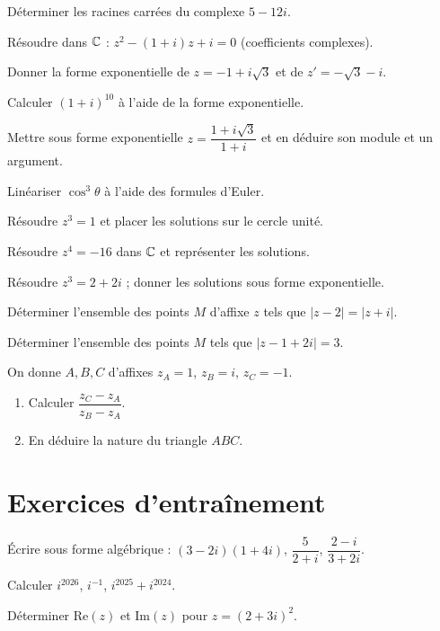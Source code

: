 \exo{} Déterminer les racines carrées du complexe $5-12i$.

\exo{} Résoudre dans $\mathbb{C}$ : $z^{2}-(1+i)z+i=0$ (coefficients complexes).

\exo{} Donner la forme exponentielle de $z=-1+i\sqrt3$ et de $z'=-\sqrt3-i$.

\exo{} Calculer $(1+i)^{10}$ à l'aide de la forme exponentielle.

\exo{} Mettre sous forme exponentielle $z=\dfrac{1+i\sqrt3}{1+i}$ et en déduire son module
et un argument.

\exo{} Linéariser $\cos^{3}\theta$ à l'aide des formules d'Euler.

\exo{} Résoudre $z^{3}=1$ et placer les solutions sur le cercle unité.

\exo{} Résoudre $z^{4}=-16$ dans $\mathbb{C}$ et représenter les solutions.

\exo{} Résoudre $z^{3}=2+2i$ ; donner les solutions sous forme exponentielle.

\exo{} Déterminer l'ensemble des points $M$ d'affixe $z$ tels que $|z-2|=|z+i|$.

\exo{} Déterminer l'ensemble des points $M$ tels que $|z-1+2i|=3$.

\exo{} On donne $A,B,C$ d'affixes $z_A=1$, $z_B=i$, $z_C=-1$.
\begin{enumerate}[label=\arabic*)]
\item Calculer $\dfrac{z_C-z_A}{z_B-z_A}$.
\item En déduire la nature du triangle $ABC$.
\end{enumerate}

\section{Exercices d'entraînement}

\exo{} Écrire sous forme algébrique : $(3-2i)(1+4i)$, $\dfrac{5}{2+i}$, $\dfrac{2-i}{3+2i}$.

\exo{} Calculer $i^{2026}$, $i^{-1}$, $i^{2025}+i^{2024}$.

\exo{} Déterminer $\mathrm{Re}(z)$ et $\mathrm{Im}(z)$ pour $z=(2+3i)^{2}$.

